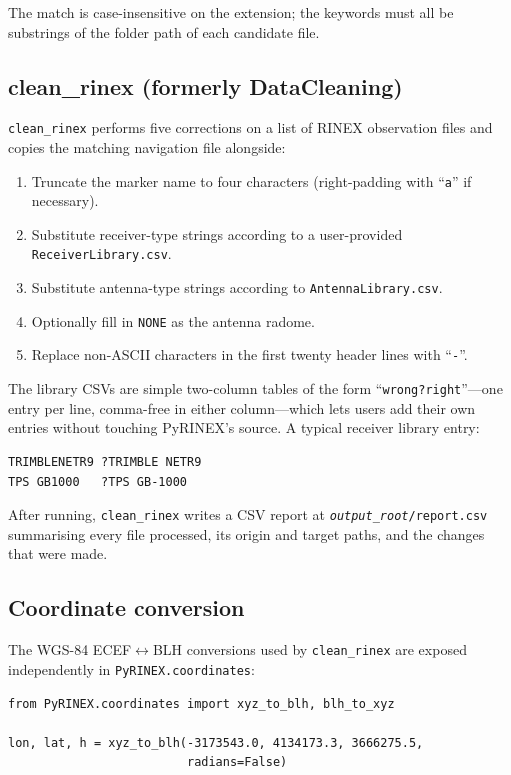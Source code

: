 \documentclass[11pt,a4paper]{article}
\begin{document}
The match is case-insensitive on the extension; the keywords must all
be substrings of the folder path of each candidate file.

\subsection{clean\_rinex (formerly DataCleaning)}

\texttt{clean\_rinex} performs five corrections on a list of RINEX
observation files and copies the matching navigation file alongside:

\begin{enumerate}
    \item Truncate the marker name to four characters
    (right-padding with ``\texttt{a}'' if necessary).
    \item Substitute receiver-type strings according to a user-provided
    \texttt{ReceiverLibrary.csv}.
    \item Substitute antenna-type strings according to
    \texttt{AntennaLibrary.csv}.
    \item Optionally fill in \texttt{NONE} as the antenna radome.
    \item Replace non-ASCII characters in the first twenty header
    lines with ``\texttt{-}''.
\end{enumerate}

The library CSVs are simple two-column tables of the form
``\texttt{wrong?right}''---one entry per line, comma-free in either
column---which lets users add their own entries without touching
PyRINEX's source. A typical receiver library entry:

\begin{lstlisting}
TRIMBLENETR9 ?TRIMBLE NETR9
TPS GB1000   ?TPS GB-1000
\end{lstlisting}

After running, \texttt{clean\_rinex} writes a CSV report at
\texttt{\textit{output\_root}/report.csv} summarising every file
processed, its origin and target paths, and the changes that were
made.

\subsection{Coordinate conversion}

The WGS-84 ECEF$\leftrightarrow$BLH conversions used by
\texttt{clean\_rinex} are exposed independently in
\texttt{PyRINEX.coordinates}:

\begin{lstlisting}
from PyRINEX.coordinates import xyz_to_blh, blh_to_xyz

lon, lat, h = xyz_to_blh(-3173543.0, 4134173.3, 3666275.5,
                         radians=False)
\end{lstlisting}
\end{document}
